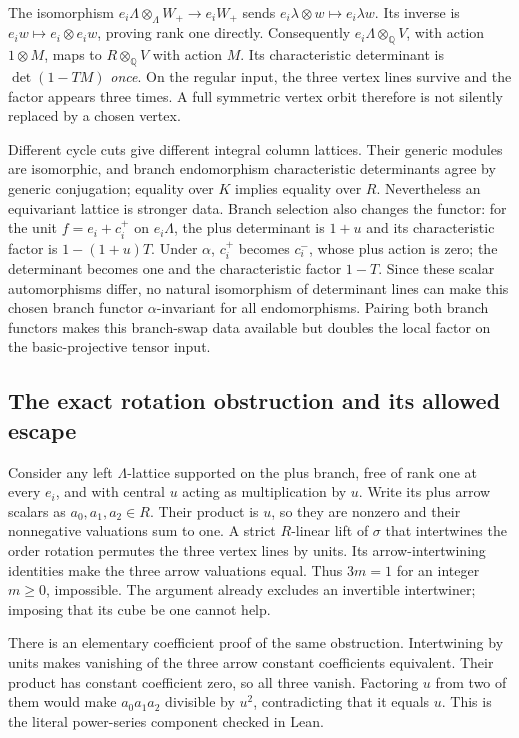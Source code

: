 The isomorphism $e_i\Lambda\otimes_\Lambda W_+\to e_iW_+$ sends $e_i\lambda\otimes w\mapsto e_i\lambda w$. Its inverse is $e_iw\mapsto e_i\otimes e_iw$, proving rank one directly. Consequently $e_i\Lambda\otimes_{\mathbb Q}V$, with action $1\otimes M$, maps to $R\otimes_{\mathbb Q}V$ with action $M$. Its characteristic determinant is $\det(1-TM)$ \emph{once}. On the regular input, the three vertex lines survive and the factor appears three times. A full symmetric vertex orbit therefore is not silently replaced by a chosen vertex.

Different cycle cuts give different integral column lattices. Their generic modules are isomorphic, and branch endomorphism characteristic determinants agree by generic conjugation; equality over $K$ implies equality over $R$. Nevertheless an equivariant lattice is stronger data. Branch selection also changes the functor: for the unit $f=e_i+c_i^+$ on $e_i\Lambda$, the plus determinant is $1+u$ and its characteristic factor is $1-(1+u)T$. Under $\alpha$, $c_i^+$ becomes $c_i^-$, whose plus action is zero; the determinant becomes one and the characteristic factor $1-T$. Since these scalar automorphisms differ, no natural isomorphism of determinant lines can make this chosen branch functor $\alpha$-invariant for all endomorphisms. Pairing both branch functors makes this branch-swap data available but doubles the local factor on the basic-projective tensor input.

\subsection{The exact rotation obstruction and its allowed escape}
Consider any left $\Lambda$-lattice supported on the plus branch, free of rank one at every $e_i$, and with central $u$ acting as multiplication by $u$. Write its plus arrow scalars as $a_0,a_1,a_2\in R$. Their product is $u$, so they are nonzero and their nonnegative valuations sum to one. A strict $R$-linear lift of $\sigma$ that intertwines the order rotation permutes the three vertex lines by units. Its arrow-intertwining identities make the three arrow valuations equal. Thus $3m=1$ for an integer $m\ge0$, impossible. The argument already excludes an invertible intertwiner; imposing that its cube be one cannot help.

There is an elementary coefficient proof of the same obstruction. Intertwining by units makes vanishing of the three arrow constant coefficients equivalent. Their product has constant coefficient zero, so all three vanish. Factoring $u$ from two of them would make $a_0a_1a_2$ divisible by $u^2$, contradicting that it equals $u$. This is the literal power-series component checked in Lean.

